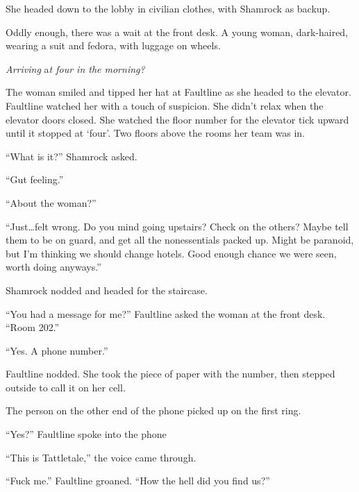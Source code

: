 She headed down to the lobby in civilian clothes, with Shamrock as backup.



Oddly enough, there was a wait at the front desk.  A young woman, dark-haired, wearing a suit and fedora, with luggage on wheels.



\emph{Arriving} a\emph{t four in the morning?}



The woman smiled and tipped her hat at Faultline as she headed to the elevator.  Faultline watched her with a touch of suspicion.  She didn't relax when the elevator doors closed.  She watched the floor number for the elevator tick upward until it stopped at `four'.  Two floors above the rooms her team was in.



``What is it?''  Shamrock asked.



``Gut feeling.''



``About the woman?''



``Just\ldots felt wrong.  Do you mind going upstairs?  Check on the others?  Maybe tell them to be on guard, and get all the nonessentials packed up.  Might be paranoid, but I'm thinking we should change hotels.  Good enough chance we were seen, worth doing anyways.''



Shamrock nodded and headed for the staircase.



``You had a message for me?''  Faultline asked the woman at the front desk.  ``Room 202.''



``Yes.  A phone number.''



Faultline nodded.  She took the piece of paper with the number, then stepped outside to call it on her cell.



The person on the other end of the phone picked up on the first ring.



``Yes?'' Faultline spoke into the phone



``This is Tattletale,'' the voice came through.



``Fuck me.'' Faultline groaned.  ``How the hell did you find us?''



